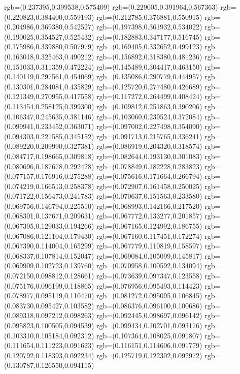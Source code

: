 {{{			rgb=(0.237395,0.399538,0.575409)
			rgb=(0.229005,0.391964,0.567363)
			rgb=(0.220823,0.384400,0.559193)
			rgb=(0.212785,0.376881,0.550915)
			rgb=(0.204986,0.369380,0.542527)
			rgb=(0.197398,0.361932,0.534022)
			rgb=(0.190025,0.354527,0.525432)
			rgb=(0.182883,0.347177,0.516745)
			rgb=(0.175986,0.339880,0.507979)
			rgb=(0.169405,0.332652,0.499123)
			rgb=(0.163018,0.325463,0.490212)
			rgb=(0.156892,0.318380,0.481236)
			rgb=(0.151033,0.311359,0.472224)
			rgb=(0.145489,0.304417,0.463150)
			rgb=(0.140119,0.297561,0.454069)
			rgb=(0.135086,0.290779,0.444957)
			rgb=(0.130301,0.284081,0.435829)
			rgb=(0.125720,0.277480,0.426689)
			rgb=(0.121349,0.270955,0.417558)
			rgb=(0.117272,0.264499,0.408424)
			rgb=(0.113454,0.258125,0.399300)
			rgb=(0.109812,0.251863,0.390206)
			rgb=(0.106347,0.245635,0.381146)
			rgb=(0.103060,0.239524,0.372084)
			rgb=(0.099941,0.233452,0.363071)
			rgb=(0.097002,0.227498,0.354090)
			rgb=(0.094303,0.221585,0.345152)
			rgb=(0.091713,0.215765,0.336241)
			rgb=(0.089220,0.209990,0.327381)
			rgb=(0.086919,0.204320,0.318574)
			rgb=(0.084717,0.198665,0.309818)
			rgb=(0.082644,0.193130,0.301083)
			rgb=(0.080696,0.187678,0.292428)
			rgb=(0.078849,0.182228,0.283823)
			rgb=(0.077157,0.176916,0.275288)
			rgb=(0.075616,0.171664,0.266794)
			rgb=(0.074219,0.166513,0.258378)
			rgb=(0.072907,0.161458,0.250025)
			rgb=(0.071722,0.156473,0.241783)
			rgb=(0.070637,0.151563,0.233580)
			rgb=(0.069756,0.146794,0.225510)
			rgb=(0.068993,0.142166,0.217520)
			rgb=(0.068301,0.137671,0.209631)
			rgb=(0.067772,0.133277,0.201857)
			rgb=(0.067395,0.129033,0.194266)
			rgb=(0.067165,0.124992,0.186755)
			rgb=(0.067086,0.121104,0.179430)
			rgb=(0.067160,0.117451,0.172274)
			rgb=(0.067390,0.114004,0.165299)
			rgb=(0.067779,0.110819,0.158597)
			rgb=(0.068337,0.107814,0.152047)
			rgb=(0.069084,0.105099,0.145817)
			rgb=(0.069909,0.102723,0.139760)
			rgb=(0.070958,0.100592,0.134094)
			rgb=(0.072150,0.098812,0.128661)
			rgb=(0.073639,0.097347,0.123558)
			rgb=(0.075176,0.096199,0.118865)
			rgb=(0.076956,0.095493,0.114423)
			rgb=(0.078977,0.095119,0.110470)
			rgb=(0.081272,0.095095,0.106845)
			rgb=(0.083730,0.095427,0.103582)
			rgb=(0.086376,0.096100,0.100686)
			rgb=(0.089318,0.097212,0.098263)
			rgb=(0.092445,0.098697,0.096142)
			rgb=(0.095823,0.100505,0.094539)
			rgb=(0.099434,0.102701,0.093176)
			rgb=(0.103310,0.105184,0.092312)
			rgb=(0.107364,0.108025,0.091807)
			rgb=(0.111654,0.111223,0.091623)
			rgb=(0.116151,0.114606,0.091779)
			rgb=(0.120792,0.118393,0.092234)
			rgb=(0.125719,0.122302,0.092972)
			rgb=(0.130787,0.126550,0.094115)
}}}
